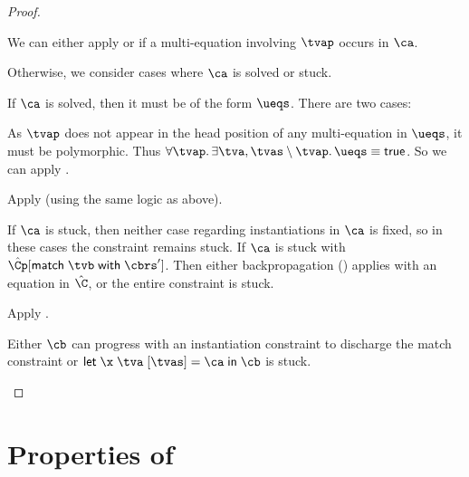 \documentclass[acmsmall,screen,nonacm,review]{acmart}
\begin{document}
\begin{proof}
\begin{proofcases}
\begin{proofcases}
\begin{proofcases}
	  \proofcase{$\hat\C\where{\cpapp \x \tvp \tvc \inst}$}
	    \begin{itemize}
	      \proofcase{$\tvp \in \reg \tv \tvs$}

		We can either apply  or 
		if a multi-equation involving $\tvp$ occurs in $\ca$.

		Otherwise, we consider cases where $\ca$ is solved or stuck.

		If $\ca$ is solved, then it must be of the form $\ueqs$.
		There are two cases:
		\begin{itemize}
		  \proofcase{$\cexists {\tv, \tvs} \ueqs \cequiv \ctrue$}
		  As $\tvp$ does not appear in the head position of any multi-equation in $\ueqs$,
		  it must be polymorphic. Thus $\cfor \tvp {\cexists {\tv, \tvs \setminus \tvp} \ueqs} \cequiv \ctrue$.
		  So we can apply .

		  \proofcase{$\cexists {\tv, \tvs} \ueqs \cnequiv \ctrue$}
		  Apply  (using the same logic as above).

		\end{itemize}

		If $\ca$ is stuck, then neither case regarding instantiations
		in $\ca$ is fixed, so in these cases the constraint remains
		stuck. If $\ca$ is stuck with $\hat\Cp\where{\cmatch \tvb
		\cbrs'}$. Then either backpropagation ()
		applies with an equation in $\hat\C$, or the entire constraint
		is stuck.

		\proofcase{$\tvp \notin \reg \tv \tvs$} Apply .




	    \end{itemize}

	  \proofcase{$\hat\C\where{\cmatch \tvp \cbrs}$}

	  Either $\cb$ can progress with an instantiation constraint to discharge
	  the match constraint or $\cletr \x \tv \tvs \ca \cb$ is stuck.
	\end{proofcases}

    \end{proofcases}


  \end{proofcases}
\end{proof}

\clearpage
\section{Properties of \OML}
\end{document}
